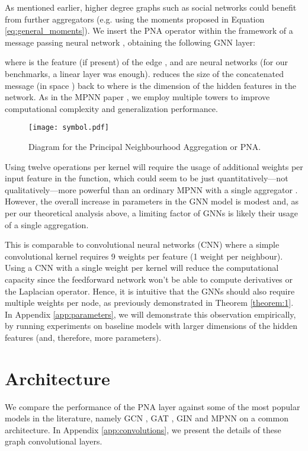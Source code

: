 \documentclass{article}
\begin{document}
As mentioned earlier, higher degree graphs such as social networks could benefit from further aggregators (e.g. using the moments proposed in Equation \ref{eq:general_moments}). We insert the PNA operator within the framework of a message passing neural network \cite{gilmer2017mpnn}, obtaining the following GNN layer:


where  is the feature (if present) of the edge ,  and  are neural networks (for our benchmarks, a linear layer was enough).  reduces the size of the concatenated message (in space ) back to  where  is the dimension of the hidden features in the network. As in the MPNN paper \cite{gilmer2017mpnn}, we employ multiple towers to improve computational complexity and generalization performance.

\begin{figure}[h]
\centering
\texttt{[image: symbol.pdf]}
\caption{Diagram for the Principal Neighbourhood Aggregation or PNA.} 
\label{fig:pna}
\end{figure}

Using twelve operations per kernel will require the usage of additional weights per input feature in the  function, which could seem to be just quantitatively---not qualitatively---more powerful than an ordinary MPNN with a single aggregator \cite{gilmer2017mpnn}. However, the overall increase in parameters in the GNN model is modest and, as per our theoretical analysis above, a limiting factor of GNNs is likely their usage of a single aggregation.

This is comparable to convolutional neural networks (CNN) where a simple  convolutional kernel requires 9 weights per feature (1 weight per neighbour). Using a CNN with a single weight per  kernel will reduce the computational capacity since the feedforward network won't be able to compute derivatives or the Laplacian operator. Hence, it is intuitive that the GNNs should also require multiple weights per node, as previously demonstrated in Theorem \ref{theorem:1}. In Appendix \ref{app:parameters}, we will demonstrate this observation empirically, by running experiments on baseline models with larger dimensions of the hidden features (and, therefore, more parameters).

\section{Architecture} \label{sec:architecture}

We compare the performance of the PNA layer against some of the most popular models in the literature, namely GCN \cite{kipf2016gcn}, GAT \cite{velikovic2017gat}, GIN \cite{xu2018gin} and MPNN \cite{gilmer2017mpnn} on a common architecture. In Appendix \ref{app:convolutions}, we present the details of these graph convolutional layers.
\end{document}
